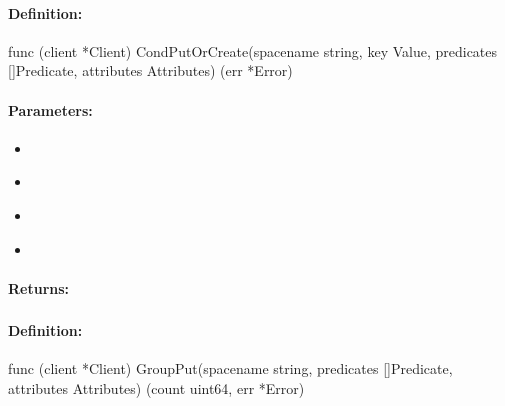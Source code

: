 \paragraph{Definition:}
\begin{gocode}
func (client *Client) CondPutOrCreate(spacename string, key Value, predicates []Predicate, attributes Attributes) (err *Error)
\end{gocode}

\paragraph{Parameters:}
\begin{itemize}[noitemsep]
\item {}\\

\item {}\\

\item {}\\

\item {}\\

\end{itemize}

\paragraph{Returns:}


\pagebreak
\subsubsection{}
\label{api:Go:GroupPut}


\paragraph{Definition:}
\begin{gocode}
func (client *Client) GroupPut(spacename string, predicates []Predicate, attributes Attributes) (count uint64, err *Error)
\end{gocode}

